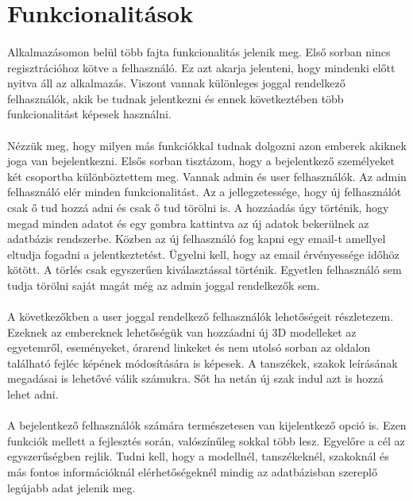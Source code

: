 \section{Funkcionalitások}
	\paragraph{}
	Alkalmazásomon belül több fajta funkcionalitás jelenik meg. Első sorban nincs regisztrációhoz kötve a felhasználó. Ez azt akarja jelenteni, hogy mindenki előtt nyitva áll az alkalmazás. Viszont vannak különleges joggal rendelkező felhasználók, akik be tudnak jelentkezni és ennek következtében több funkcionalitást képesek használni.
	\paragraph{}
	Nézzük meg, hogy milyen más funkciókkal tudnak dolgozni azon emberek akiknek joga van bejelentkezni. Elsős sorban tisztázom, hogy a bejelentkező személyeket két csoportba különböztettem meg. Vannak admin és user felhasználók. Az admin felhasználó elér minden funkcionalitást. Az a jellegzetessége, hogy új felhasználót csak ő tud hozzá adni és csak ő tud törölni is. A hozzáadás úgy történik, hogy megad minden adatot és egy gombra kattintva az új adatok bekerülnek az adatbázis rendszerbe. Közben az új felhasználó fog kapni egy email-t amellyel eltudja fogadni a jelentkeztetést. Ügyelni kell, hogy az email érvényessége időhöz kötött. A törlés csak egyszerűen kiválasztással történik. Egyetlen felhasználó sem tudja törölni saját magát még az admin joggal rendelkezők sem.
	\paragraph{}
	A következőkben a user joggal rendelkező felhasználók lehetőségeit részletezem. Ezeknek az embereknek lehetőségük van hozzáadni új 3D modelleket az egyetemről, eseményeket, órarend linkeket és nem utolsó sorban az oldalon található fejléc képének módosítására is képesek. A tanszékek, szakok leírásának megadásai is lehetővé válik számukra. Sőt ha netán új szak indul azt is hozzá lehet adni.
	\paragraph{}
	A bejelentkező felhasználók számára természetesen van kijelentkező opció is. Ezen funkciók mellett a fejlesztés során, valószínűleg sokkal több lesz. Egyelőre a cél az egyszerűségben rejlik. Tudni kell, hogy a modellnél, tanszékeknél, szakoknál és más fontos információknál elérhetőségeknél mindig az adatbázisban szereplő legújabb adat jelenik meg. 
